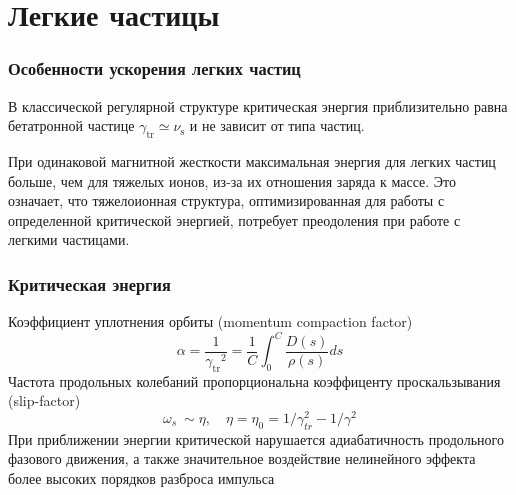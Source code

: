 \section{Легкие частицы}

\begin{frame}
	\frametitle{Особенности ускорения легких частиц}
\par В классической регулярной структуре критическая энергия приблизительно равна бетатронной частице $\gamma_{\text{tr}}\simeq\nu_{\text{s}}$ и не зависит от типа частиц.
\newline
\par При одинаковой магнитной жесткости максимальная энергия для легких частиц больше, чем для тяжелых ионов, из-за их отношения заряда к массе. Это означает, что тяжелоионная структура, оптимизированная для работы с определенной критической энергией, потребует преодоления при работе с легкими частицами.
\end{frame}

\begin{frame}
	\frametitle{Критическая энергия}
     	Коэффициент уплотнения орбиты (momentum compaction factor)
     \small \begin{equation}
     	\alpha=\frac{1}{{\gamma_{\textrm{tr}}}^2}=\frac{1}{C}\int_{0}^{C}{\frac{D\left(s\right)}{\rho\left(s\right)}ds}
     \end{equation} \normalsize 	
     	Частота продольных колебаний пропорциональна коэффиценту проскальзывания (slip-factor)
	\begin{equation}
		 \omega_s\ \sim \eta, \quad \eta=\eta_0=1/\gamma_{tr}^2-1/\gamma^2
	 \end{equation} \normalsize 	
	При приближении энергии критической нарушается адиабатичность продольного фазового движения, а также значительное воздействие нелинейного эффекта более высоких порядков разброса импульса
	 
\end{frame}

